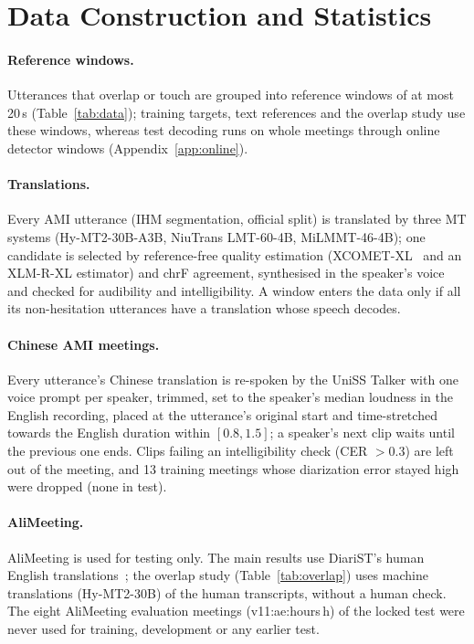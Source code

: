 
\section{Data Construction and Statistics}
\label{app:data}

\paragraph{Reference windows.} Utterances that overlap or touch are grouped into reference windows of at most 20\,s
(Table~\ref{tab:data}); training targets, text references and the overlap study use these windows, whereas test
decoding runs on whole meetings through online detector windows (Appendix~\ref{app:online}).



\paragraph{Translations.} Every AMI utterance (IHM segmentation, official split) is translated by three MT systems
(Hy-MT2-30B-A3B, NiuTrans LMT-60-4B, MiLMMT-46-4B); one candidate is selected by reference-free quality estimation
(XCOMET-XL~\citep{guerreiro2024xcomet} and an XLM-R-XL estimator) and chrF agreement, synthesised in the speaker's
voice and checked for audibility and intelligibility. A window enters the data only if all its non-hesitation
utterances have a translation whose speech decodes.

\paragraph{Chinese AMI meetings.}\label{app:zhdata} Every utterance's Chinese translation is re-spoken by the UniSS
Talker with one voice prompt per speaker, trimmed, set to the speaker's median loudness in the English recording,
placed at the utterance's original start and time-stretched towards the English duration within $[0.8,1.5]$; a
speaker's next clip waits until the previous one ends. Clips failing an intelligibility check (CER $>0.3$) are left out
of the meeting, and 13 training meetings whose diarization error stayed high were dropped (none in test).

\paragraph{AliMeeting.} AliMeeting is used for testing only. The main results use DiariST's human English
translations~\citep{yang2024diarist}; the overlap study (Table~\ref{tab:overlap}) uses machine
translations (Hy-MT2-30B) of the human transcripts, without a human check. The eight AliMeeting evaluation meetings
(\num{v11:ae:hours}\,h) of the locked test were never used for training, development or any earlier test.

